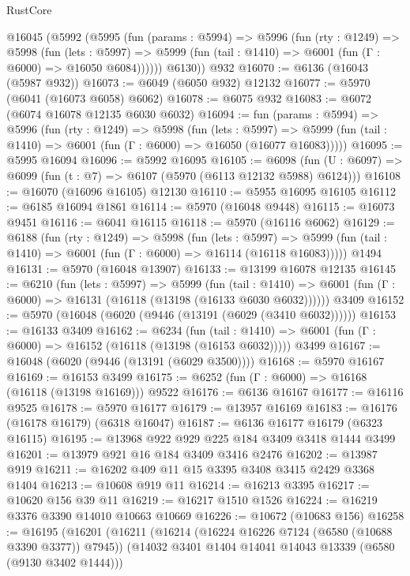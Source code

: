 \begin{lexlean}{RustCore}
\begin{coremodule}
    @16045
      (@5992
        (@5995
          (fun (params : @5994) =>
          @5996
            (fun (rty : @1249) =>
            @5998
              (fun (lets : @5997) =>
              @5999 (fun (tail : @1410) => @6001 (fun (Γ : @6000) => @16050 @6084))))))
        @6130))
    @932
@16070 := @6136 (@16043 (@5987 @932))
@16073 := @6049 (@6050 @932) @12132
@16077 := @5970 (@6041 (@16073 @6058) @6062)
@16078 := @6075 @932
@16083 := @6072 (@6074 @16078 @12135 @6030 @6032)
@16094 := fun (params : @5994) =>
  @5996
    (fun (rty : @1249) =>
    @5998
      (fun (lets : @5997) =>
      @5999 (fun (tail : @1410) => @6001 (fun (Γ : @6000) => @16050 (@16077 @16083)))))
@16095 := @5995 @16094
@16096 := @5992 @16095
@16105 := @6098
    (fun (U : @6097) => @6099 (fun (t : @7) => @6107 (@5970 (@6113 @12132 @5988) @6124)))
@16108 := @16070 (@16096 @16105) @12130
@16110 := @5955 @16095 @16105
@16112 := @6185 @16094 @1861
@16114 := @5970 (@16048 @9448)
@16115 := @16073 @9451
@16116 := @6041 @16115
@16118 := @5970 (@16116 @6062)
@16129 := @6188
    (fun (rty : @1249) =>
    @5998
      (fun (lets : @5997) =>
      @5999 (fun (tail : @1410) => @6001 (fun (Γ : @6000) => @16114 (@16118 @16083)))))
    @1494
@16131 := @5970 (@16048 @13907)
@16133 := @13199 @16078 @12135
@16145 := @6210
    (fun (lets : @5997) =>
    @5999
      (fun (tail : @1410) =>
      @6001 (fun (Γ : @6000) => @16131 (@16118 (@13198 (@16133 @6030 @6032))))))
    @3409
@16152 := @5970 (@16048 (@6020 (@9446 (@13191 (@6029 (@3410 @6032))))))
@16153 := @16133 @3409
@16162 := @6234
    (fun (tail : @1410) => @6001 (fun (Γ : @6000) => @16152 (@16118 (@13198 (@16153 @6032)))))
    @3499
@16167 := @16048 (@6020 (@9446 (@13191 (@6029 @3500))))
@16168 := @5970 @16167
@16169 := @16153 @3499
@16175 := @6252 (fun (Γ : @6000) => @16168 (@16118 (@13198 @16169))) @9522
@16176 := @6136 @16167
@16177 := @16116 @9525
@16178 := @5970 @16177
@16179 := @13957 @16169
@16183 := @16176 (@16178 @16179) (@6318 @16047)
@16187 := @6136 @16177 @16179 (@6323 @16115)
@16195 := @13968 @922 @929 @225 @184 @3409 @3418 @1444 @3499
@16201 := @13979 @921 @16 @184 @3409 @3416 @2476
@16202 := @13987 @919
@16211 := @16202 @409 @11 @15 @3395 @3408 @3415 @2429 @3368 @1404
@16213 := @10608 @919 @11
@16214 := @16213 @3395
@16217 := @10620 @156 @39 @11
@16219 := @16217 @1510 @1526
@16224 := @16219 @3376 @3390 @14010 @10663 @10669
@16226 := @10672 (@10683 @156)
@16258 := @16195
    (@16201
      (@16211
        (@16214 (@16224 @16226 @7124 (@6580 (@10688 @3390 @3377)) @7945))
        (@14032 @3401 @1404 @14041 @14043 @13339 (@6580 (@9130 @3402 @1444)))

\end{coremodule}
\end{lexlean}
